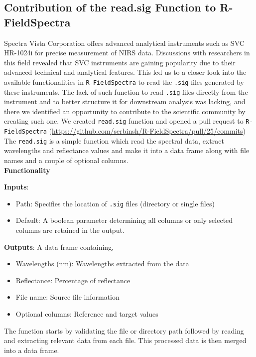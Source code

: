 \documentclass[12pt,a4paper]{report}
\begin{document}
\subsection{Contribution of the read.sig Function to R-FieldSpectra}
Spectra Vista Corporation offers advanced analytical instruments such as SVC HR-1024i for precise measurement of NIRS data. Discussions with researchers in this field revealed that SVC instruments are gaining popularity due to their advanced technical and analytical features. This led us to a closer look into the available functionalities in \texttt{R-FieldSpectra} to read the \texttt{.sig} files generated by these instruments. The lack of such function to read \texttt{.sig} files directly from the instrument and to better structure it for downstream analysis was lacking, and there we identified an opportunity to contribute to the scientific community by creating such one. We created \texttt{read.sig} function and opened a pull request to \texttt{R-FieldSpectra} (\url{https://github.com/serbinsh/R-FieldSpectra/pull/25/commits}) The \texttt{read.sig} is a simple function which read the spectral data, extract wavelengths and reflectance values and make it into a data frame along with file names and a couple of optional columns.\\

\textbf{Functionality}

\textbf{Inputs}:
\begin{itemize}
    \item Path: Specifies the location of \texttt{.sig} files (directory or single files)
    \item Default: A boolean parameter determining all columns or only selected columns are retained in the output.
\end{itemize}

\textbf{Outputs}: A data frame containing,
\begin{itemize}
    \item Wavelengths (nm): Wavelengths extracted from the data
    \item Reflectance: Percentage of reflectance
    \item File name: Source file information
    \item Optional columns: Reference and target values
\end{itemize}

The function starts by validating the file or directory path followed by reading and extracting relevant data from each file. This processed data is then merged into a data frame. \\
\end{document}
